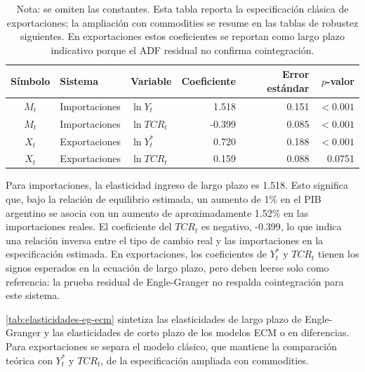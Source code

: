 \documentclass[11pt,a4paper]{article}
\begin{document}
	\begin{table}[H]
		\centering
		\caption{Coeficientes de largo plazo Engle-Granger.}
		\label{tab:coeficientes-largo-plazo-eg}
		\small
		\begin{tabular}{cllrrr}
			\toprule
			Símbolo & Sistema & Variable & Coeficiente & Error estándar & \(p\)-valor \\
			\midrule
			\(M_t\) & Importaciones & \(\ln Y_t\) & 1.518 & 0.151 & \(<0.001\) \\
			\(M_t\) & Importaciones & \(\ln TCR_t\) & -0.399 & 0.085 & \(<0.001\) \\
			\(X_t\) & Exportaciones & \(\ln Y_t^*\) & 0.720 & 0.188 & \(<0.001\) \\
			\(X_t\) & Exportaciones & \(\ln TCR_t\) & 0.159 & 0.088 & 0.0751 \\
			\bottomrule
		\end{tabular}
		\caption*{\footnotesize Nota: se omiten las constantes. Esta tabla reporta la
			especificación clásica de exportaciones; la ampliación con commodities se
			resume en las tablas de robustez siguientes. En exportaciones estos
			coeficientes se reportan como largo plazo indicativo porque el ADF residual no
			confirma cointegración.}
	\end{table}
	
	Para importaciones, la elasticidad ingreso de largo plazo es 1.518. Esto
	significa que, bajo la relación de equilibrio estimada, un aumento de 1\% en el
	PIB argentino se asocia con un aumento de aproximadamente 1.52\% en las
	importaciones reales. El coeficiente del \(TCR_t\) es negativo, -0.399, lo que
	indica una relación inversa entre el tipo de cambio real y las importaciones en
	la especificación estimada. En exportaciones, los coeficientes de \(Y_t^*\) y
	\(TCR_t\) tienen los signos esperados en la ecuación de largo plazo, pero deben
	leerse solo como referencia: la prueba residual de Engle-Granger no respalda
	cointegración para este sistema.
	
	\autoref{tab:elasticidades-eg-ecm} sintetiza las elasticidades de largo plazo
	de Engle-Granger y las elasticidades de corto plazo de los modelos ECM o en
	diferencias. Para exportaciones se separa el modelo clásico, que mantiene la
	comparación teórica con \(Y_t^*\) y \(TCR_t\), de la especificación ampliada con
	commodities.
	
\end{document}
